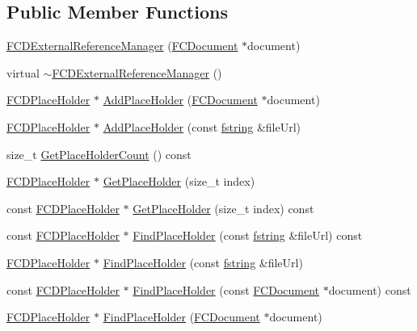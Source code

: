 \subsection*{Public Member Functions}
\begin{DoxyCompactItemize}
\item 
\hyperlink{classFCDExternalReferenceManager_a1a2d6c38874ca05e641e7435d2c99d15}{FCDExternalReferenceManager} (\hyperlink{classFCDocument}{FCDocument} $\ast$document)
\item 
virtual \hyperlink{classFCDExternalReferenceManager_a54c82f52411a67e27ed085257648a3de}{$\sim$FCDExternalReferenceManager} ()
\item 
\hyperlink{classFCDPlaceHolder}{FCDPlaceHolder} $\ast$ \hyperlink{classFCDExternalReferenceManager_a71f3dc8d19a92f32aceb77886563b98d}{AddPlaceHolder} (\hyperlink{classFCDocument}{FCDocument} $\ast$document)
\item 
\hyperlink{classFCDPlaceHolder}{FCDPlaceHolder} $\ast$ \hyperlink{classFCDExternalReferenceManager_af4a273a9e4a40647e5e874f7e9fa4ede}{AddPlaceHolder} (const \hyperlink{classfm_1_1stringT}{fstring} \&fileUrl)
\item 
size\_\-t \hyperlink{classFCDExternalReferenceManager_ac79e8b1f68b26f8f3f40afd82e7c923b}{GetPlaceHolderCount} () const 
\item 
\hyperlink{classFCDPlaceHolder}{FCDPlaceHolder} $\ast$ \hyperlink{classFCDExternalReferenceManager_a6a59d88cc384c0f515ce138b3a8f3f07}{GetPlaceHolder} (size\_\-t index)
\item 
const \hyperlink{classFCDPlaceHolder}{FCDPlaceHolder} $\ast$ \hyperlink{classFCDExternalReferenceManager_a33e290a56348fce8f2d0cfcbff132f76}{GetPlaceHolder} (size\_\-t index) const 
\item 
const \hyperlink{classFCDPlaceHolder}{FCDPlaceHolder} $\ast$ \hyperlink{classFCDExternalReferenceManager_adbdae14f6202150d11c0dd8bda42ad35}{FindPlaceHolder} (const \hyperlink{classfm_1_1stringT}{fstring} \&fileUrl) const 
\item 
\hyperlink{classFCDPlaceHolder}{FCDPlaceHolder} $\ast$ \hyperlink{classFCDExternalReferenceManager_a988da44bbddbb3b99c0e567590d3ba6d}{FindPlaceHolder} (const \hyperlink{classfm_1_1stringT}{fstring} \&fileUrl)
\item 
const \hyperlink{classFCDPlaceHolder}{FCDPlaceHolder} $\ast$ \hyperlink{classFCDExternalReferenceManager_a578f4a2cdc248fb0a596f0c0210f268e}{FindPlaceHolder} (const \hyperlink{classFCDocument}{FCDocument} $\ast$document) const 
\item 
\hyperlink{classFCDPlaceHolder}{FCDPlaceHolder} $\ast$ \hyperlink{classFCDExternalReferenceManager_acd9ce00d9efa5e4964f5baae12c6b4aa}{FindPlaceHolder} (\hyperlink{classFCDocument}{FCDocument} $\ast$document)
\end{DoxyCompactItemize}
